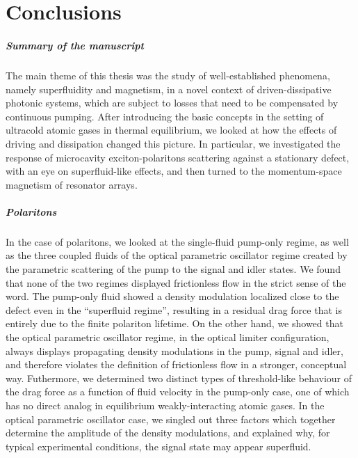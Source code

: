 \chapter*{Conclusions}


\paragraph{Summary of the manuscript}
The main theme of this thesis was the study of well-established
phenomena, namely superfluidity and magnetism, in a novel context of
driven-dissipative photonic systems, which are subject to losses that
need to be compensated by continuous pumping. After introducing the
basic concepts in the setting of ultracold atomic gases in thermal
equilibrium, we looked at how the effects of driving and dissipation
changed this picture. In particular, we investigated the response of
microcavity exciton-polaritons scattering against a stationary defect,
with an eye on superfluid-like effects, and then turned to the
momentum-space magnetism of resonator arrays.

\paragraph{Polaritons}
In the case of polaritons, we looked at the single-fluid pump-only
regime, as well as the three coupled fluids of the optical parametric
oscillator regime created by the parametric scattering of the pump to
the signal and idler states. We found that none of the two regimes
displayed frictionless flow in the strict sense of the word. The
pump-only fluid showed a density modulation localized close to the
defect even in the ``superfluid regime'', resulting in a residual drag
force that is entirely due to the finite polariton lifetime. On the
other hand, we showed that the optical parametric oscillator regime,
in the optical limiter configuration, always displays propagating
density modulations in the pump, signal and idler, and therefore
violates the definition of frictionless flow in a stronger, conceptual
way. Futhermore, we determined two distinct types of threshold-like
behaviour of the drag force as a function of fluid velocity in the
pump-only case, one of which has no direct analog in equilibrium
weakly-interacting atomic gases. In the optical parametric oscillator
case, we singled out three factors which together determine the
amplitude of the density modulations, and explained why, for typical
experimental conditions, the signal state may appear superfluid.

